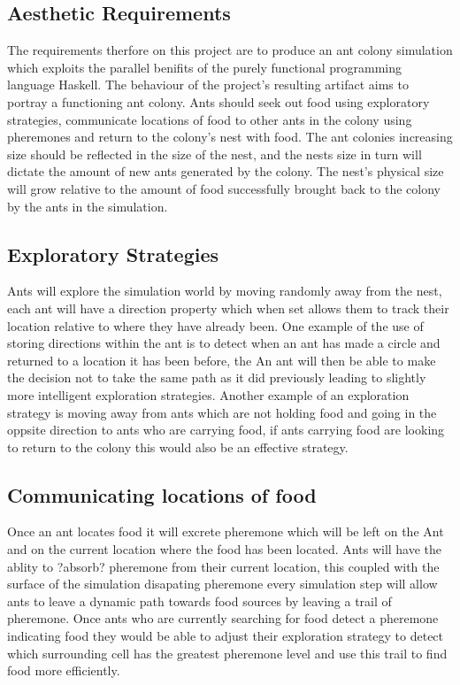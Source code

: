 \documentclass[main.tex]{subfiles}
\begin{document}
\subsection{Aesthetic Requirements}
The requirements therfore on this project are to produce an ant colony simulation which exploits the parallel benifits of the purely functional programming language Haskell. The behaviour of the project's resulting artifact aims to portray a functioning ant colony. Ants should seek out food using exploratory strategies, communicate locations of food to other ants in the colony using pheremones and return to the colony's nest with food. The ant colonies increasing size should be reflected in the size of the nest, and the nests size in turn will dictate the amount of new ants generated by the colony. The nest's physical size will grow relative to the amount of food successfully brought back to the colony by the ants in the simulation.

\subsection{Exploratory Strategies}
Ants will explore the simulation world by moving randomly away from the nest, each ant will have a direction property which when set allows them to track their location relative to where they have already been. One example of the use of storing directions within the ant is to detect when an ant has made a circle and returned to a location it has been before, the An ant will then be able to make the decision not to take the same path as it did previously  leading to slightly more intelligent exploration strategies. Another example of an exploration strategy is moving away from ants which are not holding food and going in the oppsite direction to ants who are carrying food, if ants carrying food are looking to return to the colony this would also be an effective strategy.

\subsection{Communicating locations of food}
Once an ant locates food it will excrete pheremone which will be left on the Ant and on the current location where the food has been located. Ants will have the ablity to ?absorb? pheremone from their current location, this coupled with the surface of the simulation disapating pheremone every simulation step will allow ants to leave a dynamic path towards food sources by leaving a trail of pheremone. Once ants who are currently searching for food detect a pheremone indicating food they would be able to adjust their exploration strategy to detect which surrounding cell has the greatest pheremone level and use this trail to find food more efficiently.
\end{document}

